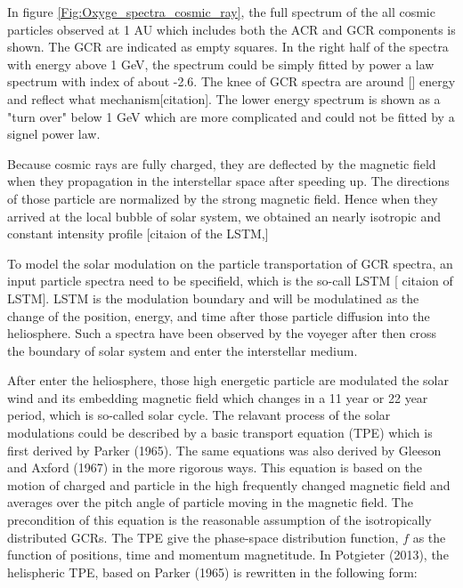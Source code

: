 In figure \ref{Fig:Oxyge_spectra_cosmic_ray}, the full spectrum of the all cosmic particles observed at 1 AU which includes both the \ac{ACR} and \ac{GCR} components is shown. The \acs{GCR} are indicated as empty squares. In the right half of the spectra with energy above 1 GeV, the spectrum could be simply fitted by power a law spectrum with index of about -2.6. The knee of GCR spectra are around [] energy and reflect what mechanism[citation]. The lower energy spectrum is shown as a "turn over" below 1 GeV which are more complicated and could not be fitted by a signel power law. 

Because cosmic rays are fully charged, they are deflected by the magnetic field when they propagation in the interstellar space after speeding up. The directions of those particle are normalized by the strong magnetic field. Hence when they arrived at the local bubble of solar system, we obtained an nearly isotropic and constant intensity profile [citaion of the LSTM,]

To model the solar modulation on the particle transportation of GCR spectra, an input particle spectra need to be specifield, which is the so-call LSTM [ citaion of LSTM]. LSTM is the modulation boundary and will be modulatined as the change of the position, energy, and time after those particle diffusion into the heliosphere. Such a spectra have been observed by the voyeger after then cross the boundary of solar system and enter the interstellar medium.



After enter the heliosphere, those high energetic particle are modulated the solar wind and its embedding magnetic field  which changes in a 11 year or 22 year period, which is so-called solar cycle.
The relavant process of the solar modulations could be described by a basic transport equation (TPE) which is first derived by Parker (1965). The same equations was also derived by Gleeson and Axford (1967) in the more rigorous ways. This equation is based on the motion of charged and particle in the high frequently changed magnetic field and averages over the pitch angle of particle moving in the magnetic field. The precondition of this equation is the reasonable assumption of the isotropically distributed GCRs. The TPE give the phase-space distribution function, $f$ as the function of positions, time and momentum magnetitude. In Potgieter (2013), the helispheric TPE, based on Parker (1965) is rewritten in the following form:

